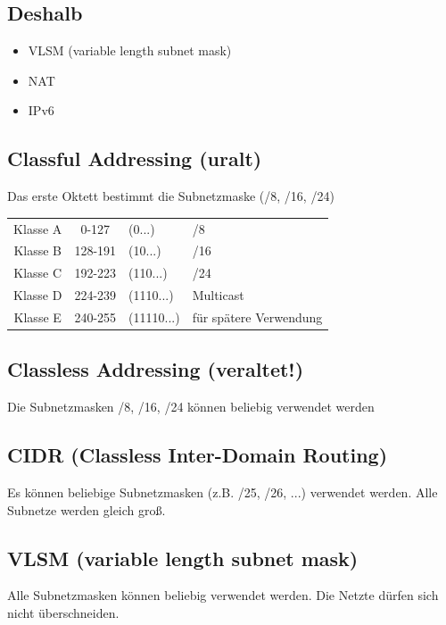 \subsection*{Deshalb}
\begin{itemize}
	\item VLSM (variable length subnet mask)
	\item NAT
	\item IPv6
\end{itemize} 

\subsection*{Classful Addressing (uralt)}
Das erste Oktett bestimmt die Subnetzmaske (/8, /16, /24)
\begin{table}[H]
	\begin{tabular}{ccll}
		Klasse A & 0-127 & (0...) & /8 \\
		Klasse B & 128-191 & (10...) & /16 \\
		Klasse C & 192-223 & (110...) & /24 \\
		Klasse D & 224-239 & (1110...) & Multicast \\
		Klasse E & 240-255 & (11110...) & für spätere Verwendung
	\end{tabular}
\end{table}

\subsection*{Classless Addressing (veraltet!)}
Die Subnetzmasken /8, /16, /24 können beliebig verwendet werden

\subsection*{CIDR (Classless Inter-Domain Routing)}
Es können beliebige Subnetzmasken (z.B. /25, /26, ...) verwendet werden. Alle Subnetze werden gleich groß.

\subsection*{VLSM (variable length subnet mask)}
Alle Subnetzmasken können beliebig verwendet werden. Die Netzte dürfen sich nicht überschneiden.

